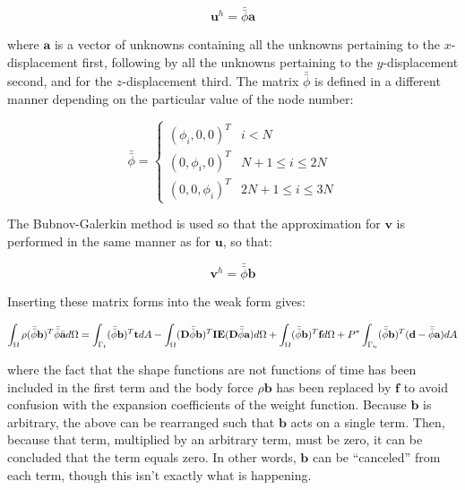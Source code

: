 \documentclass[10pt]{article}
\begin{document}
\begin{equation}
\textbf{u}^h=\bar{\bar{\phi}}\textbf{a}
\end{equation}

where \(\textbf{a}\) is a vector of unknowns containing all the unknowns pertaining to the \(x\)-displacement first, following by all the unknowns pertaining to the \(y\)-displacement second, and for the \(z\)-displacement third. The matrix \(\bar{\bar{\phi}}\) is defined in a different manner depending on the particular value of the node number:

\begin{equation}
\bar{\bar{\phi}}=
\begin{cases}(\phi_i, 0, 0)^T & i < N\\(0, \phi_i, 0)^T & N+1\leq i\leq 2N \\ (0, 0, \phi_i)^T & 2N+1\leq i\leq 3N
\end{cases}
\end{equation}

The Bubnov-Galerkin method is used so that the approximation for \(\textbf{v}\) is performed in the same manner as for \(\textbf{u}\), so that:

\begin{equation}
\textbf{v}^h=\bar{\bar{\phi}}\textbf{b}
\end{equation}

Inserting these matrix forms into the weak form gives:

\begin{equation}
\int_{\Omega}\rho(\bar{\bar{\phi}}\textbf{b})^T\bar{\bar{\phi}}\ddot{\textbf{a}}d\Omega=\int_{\Gamma_t}(\bar{\bar{\phi}}\textbf{b})^T\textbf{t}dA- \int_{\Omega}(\textbf{D}\bar{\bar{\phi}}\textbf{b})^T\textbf{IE}(\textbf{D}\bar{\bar{\phi}}\textbf{a})d\Omega +\int_{\Omega}(\bar{\bar{\phi}}\textbf{b})^T\textbf{f}d\Omega+P^{*}\int_{\Gamma_u}(\bar{\bar{\phi}}\textbf{b})^T(\textbf{d}-\bar{\bar{\phi}}\textbf{a})dA\\
\end{equation}

where the fact that the shape functions are not functions of time has been included in the first term and the body force \(\rho\textbf{b}\) has been replaced by \(\textbf{f}\) to avoid confusion with the expansion coefficients of the weight function. Because \(\textbf{b}\) is arbitrary, the above can be rearranged such that \(\textbf{b}\) acts on a single term. Then, because that term, multiplied by an arbitrary term, must be zero, it can be concluded that the term equals zero. In other words, \(\textbf{b}\) can be ``canceled'' from each term, though this isn't exactly what is happening.
\end{document}
